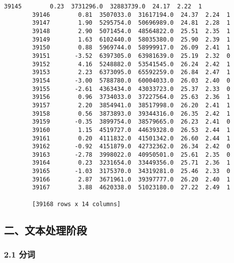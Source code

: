 \documentclass[11pt]{article}
\begin{document}
\begin{Verbatim}[commandchars=\\\{\}]
        39145        0.23  3731296.0  32883739.0  24.17  2.22  1  
        39146        0.81  3507033.0  31617194.0  24.37  2.24  1  
        39147        1.90  5295754.0  50696989.0  24.81  2.28  1  
        39148        2.90  5071454.0  48564822.0  25.51  2.35  1  
        39149        1.63  6102440.0  58035380.0  25.90  2.39  1  
        39150        0.88  5969744.0  58999917.0  26.09  2.41  1  
        39151       -3.52  6397305.0  63981639.0  25.19  2.32  0  
        39152        4.16  5248882.0  53541545.0  26.24  2.42  1  
        39153        2.23  6373095.0  65592259.0  26.84  2.47  1  
        39154       -3.00  5788780.0  60004033.0  26.03  2.40  0  
        39155       -2.61  4363434.0  43033723.0  25.37  2.33  0  
        39156        0.96  3734033.0  37227564.0  25.63  2.36  1  
        39157        2.20  3854941.0  38517998.0  26.20  2.41  1  
        39158        0.56  3873893.0  39344316.0  26.35  2.42  1  
        39159       -0.35  3899754.0  38579665.0  26.23  2.41  0  
        39160        1.15  4519727.0  44639328.0  26.53  2.44  1  
        39161        0.20  4111832.0  41501342.0  26.60  2.44  1  
        39162       -0.92  4151879.0  42732362.0  26.34  2.42  0  
        39163       -2.78  3998022.0  40950501.0  25.61  2.35  0  
        39164        0.23  3231654.0  33449356.0  25.71  2.36  1  
        39165       -1.03  3175370.0  34319281.0  25.46  2.33  0  
        39166        2.87  3671961.0  39397777.0  26.20  2.40  1  
        39167        3.88  4620338.0  51023180.0  27.22  2.49  1  
        
        [39168 rows x 14 columns]
\end{Verbatim}
            
    \subsection{二、文本处理阶段}\label{ux4e8cux6587ux672cux5904ux7406ux9636ux6bb5}

    \subsubsection{2.1 分词}\label{ux5206ux8bcd}
\end{document}
